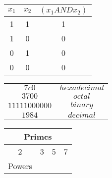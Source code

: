 \documentclass{article}
\begin{document}
		\begin{table}
			\centering
				\begin{tabular}{c|c|c}
				\hline
				\hline
			$x_{1}$&$x_{2}$&$(x_{1}ANDx_{2})$\\ \hline
					1 & 1 & 1 \\
					1 & 0 & 0 \\
					0 & 1 & 0 \\
					0 & 0 & 0 \\
					\hline
					\hline
		\end{tabular}
		\end{table}
		
		\begin{table}
\centering	
		\begin{tabular}{|c|c|}
	\hline
		$7c0$ & $hexadecimal$ \\
		$3700$ & $octal$ \\
		$11111000000$ & $binary$ \\ \cline{2-2}
		\hline
		\hline
		$1984$ & $decimal$\\
		\hline
		\end{tabular}
		\end{table}
		
		\begin{table}
			\centering
				\begin{tabular}{|c|c|c|c|}
				\hline
			  \multicolumn{4}{|c|}{Primcs} \\ \hline
				2 & 3 & 5 & 7 \\ \hline
			  \multirow{2}{*}{Powers} 
				
				
				
					
				\end{tabular}
		\end{table}
		
	
\end{document}
